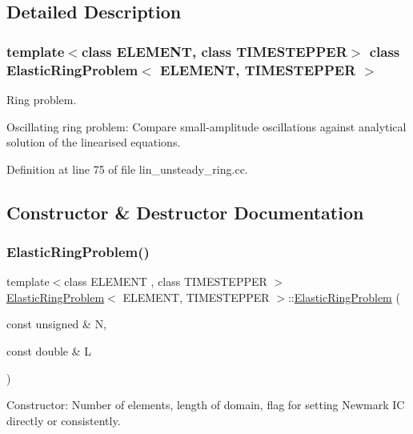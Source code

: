 \subsection{Detailed Description}
\subsubsection*{template$<$class E\+L\+E\+M\+E\+NT, class T\+I\+M\+E\+S\+T\+E\+P\+P\+ER$>$\newline
class Elastic\+Ring\+Problem$<$ E\+L\+E\+M\+E\+N\+T, T\+I\+M\+E\+S\+T\+E\+P\+P\+E\+R $>$}

Ring problem. 

Oscillating ring problem\+: Compare small-\/amplitude oscillations against analytical solution of the linearised equations. 

Definition at line 75 of file lin\+\_\+unsteady\+\_\+ring.\+cc.



\subsection{Constructor \& Destructor Documentation}
\mbox{\label{classElasticRingProblem_a57be33a379c1ec4418a7fb3e8db8ef2b}} 
\subsubsection{\texorpdfstring{Elastic\+Ring\+Problem()}{ElasticRingProblem()}\hspace{0.1cm}{\footnotesize\ttfamily [1/2]}}
{\footnotesize\ttfamily template$<$class E\+L\+E\+M\+E\+NT , class T\+I\+M\+E\+S\+T\+E\+P\+P\+ER $>$ \\
\hyperlink{classElasticRingProblem}{Elastic\+Ring\+Problem}$<$ E\+L\+E\+M\+E\+NT, T\+I\+M\+E\+S\+T\+E\+P\+P\+ER $>$\+::\hyperlink{classElasticRingProblem}{Elastic\+Ring\+Problem} (\begin{DoxyParamCaption}\item[{const unsigned \&}]{N,  }\item[{const double \&}]{L }\end{DoxyParamCaption})}



Constructor\+: Number of elements, length of domain, flag for setting Newmark IC directly or consistently. 

